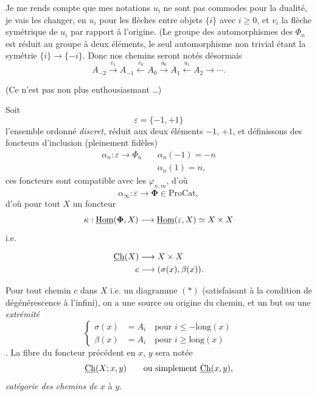 Je me rends compte que mes notations $u_i$ ne sont pas commodes pour la dualité, je vais les changer, en $u_i$ pour les flèches entre objets $\{i\}$ avec $i\ge0$, et $v_i$ la flèche symétrique de $u_i$ par rapport à l'origine. (Le groupe des automorphismes des $\Phi_n$ est réduit au groupe à deux éléments, le seul automorphisme non trivial étant la symétrie $\{i\}\longrightarrow\{-i\}$. Donc nos chemins seront notés désormais %
\[
A_{-2}\xrightarrow{v_1}A_{-1}\xleftarrow{v_0}A_0\xrightarrow{u_0}A_1\xleftarrow{u_1}A_2\longrightarrow\cdots.
\tag*{$(*)$}
\]


(Ce n'est pas non plus enthousiasmant \dots)

Soit
\[
\varepsilon=\{-1,+1\}
\]
l'ensemble ordonné \textit{discret,} réduit aux deux éléments $-1$, $+1$, et définissons des foncteurs d'inclusion (pleinement fidèles)
\[
\begin{aligned}
\alpha_n:\varepsilon\longrightarrow\Phi_n\quad & \alpha_n(-1)=-n\\
& \alpha_n(1)=n,
\end{aligned}
\]
ces foncteurs sont compatible avec les $\varphi_{n,m}$, d'où %
\[
\alpha_\infty:\varepsilon\longrightarrow\boldsymbol{\Phi}\in\mathrm{ProCat},
\]
d'où pour tout $X$ un foncteur
\[
\kappa:\underline{\mathrm{Hom}}(\boldsymbol{\Phi},X)\longrightarrow\underline{\mathrm{Hom}}(\varepsilon,X)\simeq X\times X
\]
i.e.

\[
\begin{aligned}
\underline{\mathrm{Ch}}(X) &\longrightarrow X\times X\\
c &\longrightarrow (\sigma(x),\beta(x)).
\end{aligned}
\]

 Pour tout chemin $c$ dans $X$ i.e. un diagramme $(*)$ (satisfaisant à la condition de dégénérescence à l'infini), on a une source ou origine du chemin, et un but ou une \textit{extrémité}
\[
\left\{
\begin{aligned}
\sigma(x) &= A_i\quad\text{pour } i\leq -\mathrm{long}(x)\\
\beta(x) &= A_i\quad\text{pour } i\geq \mathrm{long}(x)
\end{aligned}
\right.
\]
. La fibre du foncteur précédent en $x$, $y$ sera notée
\[
\underline{\mathrm{Ch}}(X;x,y)\qquad\text{ou simplement }\underline{\mathrm{Ch}}(x,y),
\]
\textit{catégorie des chemins de $x$} à \textit{$y$.}


